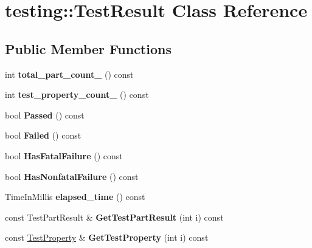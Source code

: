 \hypertarget{classtesting_1_1TestResult}{}\section{testing\+:\+:Test\+Result Class Reference}
\label{classtesting_1_1TestResult}
\subsection*{Public Member Functions}
\begin{DoxyCompactItemize}
\item 
\mbox{\label{classtesting_1_1TestResult_a6174aa4019dcda7c34d776b5741c9032}} 
int {\bfseries total\+\_\+part\+\_\+count_} () const
\item 
\mbox{\label{classtesting_1_1TestResult_afe4523257bbea8bc63b0950b702790be}} 
int {\bfseries test\+\_\+property\+\_\+count_} () const
\item 
\mbox{\label{classtesting_1_1TestResult_acf7e6e72f05a0545c48ea48e7f8851df}} 
bool {\bfseries Passed} () const
\item 
\mbox{\label{classtesting_1_1TestResult_afacc37e8b43c8574e4101bc61723c769}} 
bool {\bfseries Failed} () const
\item 
\mbox{\label{classtesting_1_1TestResult_a30e00d4076ae07fb5ad7b623d9dc1fe4}} 
bool {\bfseries Has\+Fatal\+Failure} () const
\item 
\mbox{\label{classtesting_1_1TestResult_a510564fa67b485ed4589a259f2a032d6}} 
bool {\bfseries Has\+Nonfatal\+Failure} () const
\item 
\mbox{\label{classtesting_1_1TestResult_a717e05e00d4af5cb809433e343ab63af}} 
Time\+In\+Millis {\bfseries elapsed\+\_\+time} () const
\item 
\mbox{\label{classtesting_1_1TestResult_a765c1e734ac08115757b343d57226bba}} 
const Test\+Part\+Result \& {\bfseries Get\+Test\+Part\+Result} (int i) const
\item 
\mbox{\label{classtesting_1_1TestResult_a6c2f478dbce36b57d18bedded46d70af}} 
const \hyperlink{classtesting_1_1TestProperty}{Test\+Property} \& {\bfseries Get\+Test\+Property} (int i) const
\end{DoxyCompactItemize}
